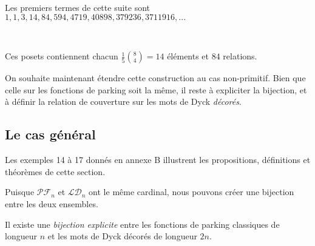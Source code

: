 Les premiers termes de cette suite sont $1, 1, 3, 14, 84,
594, 4719, 40898, 379236, 3711916, ...$\\

\begin{expl}
    ~\\
    \begin{center}
        
        Ces posets contiennent chacun $\frac {1}{5} \binom{8}{4} =
        14$ éléments et $84$ relations.
    \end{center}
\end{expl}

On souhaite maintenant étendre cette construction au cas non-primitif.
Bien que celle sur les fonctions de parking soit la même, il
reste à expliciter la bijection, et à définir la relation de couverture
sur les mots de Dyck \emph{décorés}.

\subsection{Le cas général}

Les exemples 14 à 17 donnés en annexe B illustrent les propositions,
définitions et théorèmes de cette section.

Puisque $\mathcal{PF}_n$ et $\mathcal{LD}_n$ ont le même cardinal,
nous pouvons créer une bijection entre les deux ensembles.

\begin{prop}
    Il existe une \emph{bijection explicite} entre les fonctions de parking
    classiques de longueur $n$ et les mots de Dyck décorés de
    longueur $2n$.
\end{prop}

